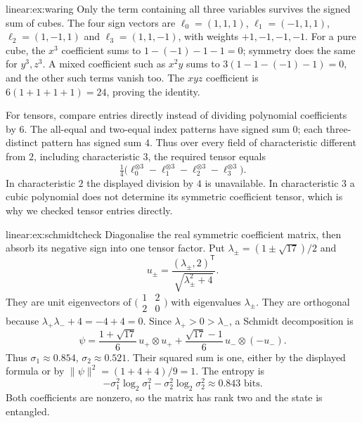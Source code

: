 \begin{solution}{linear:ex:waring}
\idea Only the term containing all three variables survives the signed sum of cubes.
\writeup The four sign vectors are $\ell_0=(1,1,1)$, $\ell_1=(-1,1,1)$, $\ell_2=(1,-1,1)$ and $\ell_3=(1,1,-1)$, with weights $+1,-1,-1,-1$. For a pure cube, the $x^3$ coefficient sums to $1-(-1)-1-1=0$; symmetry does the same for $y^3,z^3$. A mixed coefficient such as $x^2y$ sums to $3(1-1-(-1)-1)=0$, and the other such terms vanish too. The $xyz$ coefficient is $6(1+1+1+1)=24$, proving the identity.

For tensors, compare entries directly instead of dividing polynomial coefficients by $6$. The all-equal and two-equal index patterns have signed sum $0$; each three-distinct pattern has signed sum $4$. Thus over every field of characteristic different from $2$, including characteristic $3$, the required tensor equals
\[
\tfrac14\bigl(\ell_0^{\otimes3}-\ell_1^{\otimes3}
 -\ell_2^{\otimes3}-\ell_3^{\otimes3}\bigr).
\]
In characteristic $2$ the displayed division by $4$ is unavailable. In characteristic $3$ a cubic polynomial does not determine its symmetric coefficient tensor, which is why we checked tensor entries directly.
\end{solution}

\begin{solution}{linear:ex:schmidtcheck}
\idea Diagonalise the real symmetric coefficient matrix, then absorb its negative sign into one tensor factor.
\writeup Put $\lambda_\pm=(1\pm\sqrt{17})/2$ and
\[
u_\pm=\frac{(\lambda_\pm,2)^{\mathsf T}}{\sqrt{\lambda_\pm^2+4}}.
\]
They are unit eigenvectors of $\bigl(\begin{smallmatrix}1&2\\2&0\end{smallmatrix}\bigr)$ with eigenvalues $\lambda_\pm$. They are orthogonal because $\lambda_+\lambda_-+4=-4+4=0$. Since $\lambda_+>0>\lambda_-$, a Schmidt decomposition is
\[
\psi=\frac{1+\sqrt{17}}6\,u_+\otimes u_+
 +\frac{\sqrt{17}-1}6\,u_-\otimes(-u_-).
\]
Thus $\sigma_1\approx0.854$, $\sigma_2\approx0.521$. Their squared sum is one, either by the displayed formula or by $\|\psi\|^2=(1+4+4)/9=1$. The entropy is
\[
-\sigma_1^2\log_2\sigma_1^2-\sigma_2^2\log_2\sigma_2^2\approx0.843\text{ bits}.
\]
Both coefficients are nonzero, so the matrix has rank two and the state is entangled.
\end{solution}


